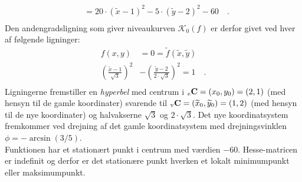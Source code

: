 \begin{example}[Hyperbel]
\begin{equation}
\begin{aligned}
&= 20\cdot (\widetilde{x}-1)^{2} - 5\cdot (\widetilde{y}-2)^{2} -60 \quad. \\
\end{aligned}
\end{equation}
Den andengradsligning som giver niveaukurven $\mathcal{K}_{0}(f)$ er derfor givet ved hver af følgende ligninger:
\begin{equation}
\begin{aligned}
f(x,y) &= 0 =
\widetilde{f}(\widetilde{x}, \widetilde{y})\\
\left(\frac{\widetilde{x}-1}{\sqrt{3}}\right)^{2} &- \left(\frac{\widetilde{y}- 2}{2\cdot\sqrt{3}} \right)^{2} = 1 \quad . \\
\end{aligned}
\end{equation}
Ligningerne fremstiller en \emph{hyperbel} med centrum i ${_\mathrm{e}\mathbf{\mathbf{C}}} = (x_{0}, y_{0}) =  (2,1)$ (med hensyn til de gamle koordinater) svarende til
${_\mathrm{v}\mathbf{\mathbf{C}}} = (\widetilde{x}_{0}, \widetilde{y}_{0}) = (1, 2)$ (med hensyn til de nye koordinater)  og halvakserne $\sqrt{3}$ og $2\cdot\sqrt{3}$. Det nye koordinatsystem fremkommer ved drejning af det gamle koordinatsystem med drejningsvinklen $\phi = -\arcsin(3/5)$.\\

Funktionen har et stationært punkt i centrum med værdien $-60$. Hesse-matricen er indefinit og derfor er det stationære punkt hverken et lokalt minimumpunkt eller maksimumpunkt.
\end{example}







